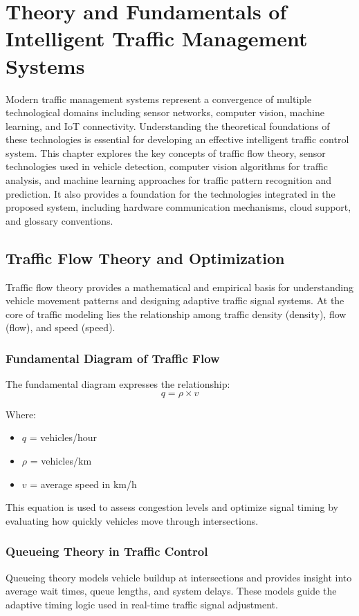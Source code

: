 \chapter{Theory and Fundamentals of Intelligent Traffic Management Systems}

Modern traffic management systems represent a convergence of multiple technological domains including sensor networks, computer vision, machine learning, and IoT connectivity. Understanding the theoretical foundations of these technologies is essential for developing an effective intelligent traffic control system. This chapter explores the key concepts of traffic flow theory, sensor technologies used in vehicle detection, computer vision algorithms for traffic analysis, and machine learning approaches for traffic pattern recognition and prediction. It also provides a foundation for the technologies integrated in the proposed system, including hardware communication mechanisms, cloud support, and glossary conventions.

\section{Traffic Flow Theory and Optimization}

Traffic flow theory provides a mathematical and empirical basis for understanding vehicle movement patterns and designing adaptive traffic signal systems. At the core of traffic modeling lies the relationship among traffic density (\gls{density}), flow (\gls{flow}), and speed (\gls{speed}).

\subsection{Fundamental Diagram of Traffic Flow}
The fundamental diagram expresses the relationship:
\begin{equation}
q = \rho \times v
\end{equation}

Where:
\begin{itemize}
\item $q$ = vehicles/hour
\item $\rho$ = vehicles/km
\item $v$ = average speed in km/h
\end{itemize}
This equation is used to assess congestion levels and optimize signal timing by evaluating how quickly vehicles move through intersections.

\subsection{Queueing Theory in Traffic Control}
Queueing theory models vehicle buildup at intersections and provides insight into average wait times, queue lengths, and system delays. These models guide the adaptive timing logic used in real-time traffic signal adjustment.

